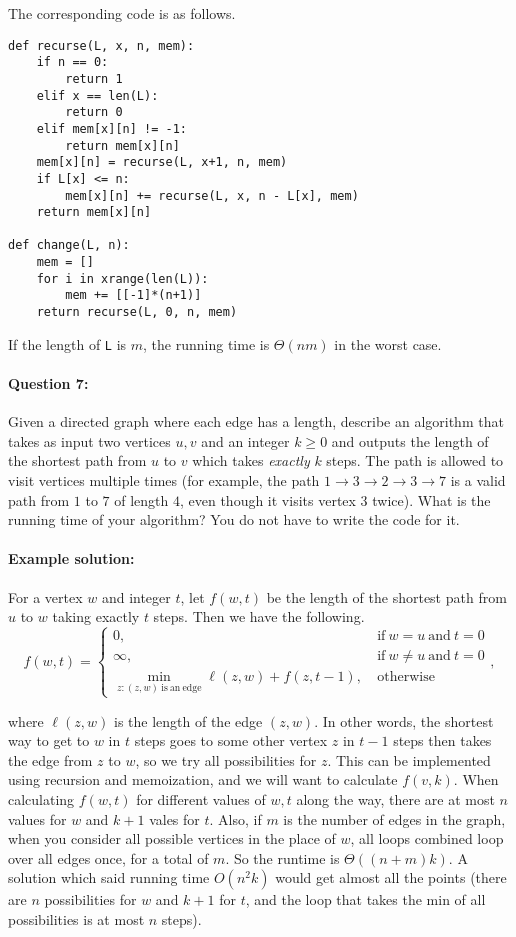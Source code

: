 \documentclass[11pt]{article}
\begin{document}
The corresponding code is as follows.

\begin{verbatim}
def recurse(L, x, n, mem):
    if n == 0:
        return 1
    elif x == len(L):
        return 0
    elif mem[x][n] != -1:
        return mem[x][n]
    mem[x][n] = recurse(L, x+1, n, mem)
    if L[x] <= n:
        mem[x][n] += recurse(L, x, n - L[x], mem)
    return mem[x][n]

def change(L, n):
    mem = []
    for i in xrange(len(L)):
        mem += [[-1]*(n+1)]
    return recurse(L, 0, n, mem)
\end{verbatim}

If the length of \texttt{L} is $m$, the running time is $\Theta(nm)$
in the worst case.

\paragraph{Question 7:}  Given a directed graph where each edge has a
length, describe an algorithm that takes as input two vertices $u,v$
and an integer $k\ge 0$ and outputs the length of the shortest path
from $u$ to $v$ which takes {\em exactly} $k$ steps.  The path is
allowed to visit vertices multiple times (for example, the path
$1\rightarrow 3\rightarrow 2\rightarrow 3\rightarrow 7$ is a valid
path from $1$ to $7$ of length $4$, even though it visits vertex $3$
twice).  What is the running time of your algorithm?  You do not have
to write the code for it.

\paragraph{Example solution:}
For a vertex $w$ and integer $t$, let $f(w,t)$ be the length of the
shortest path from $u$ to $w$ taking exactly $t$ steps. Then we have
the following.
$$
f(w, t) = \begin{cases} 0, \ &
  \mathrm{if}\ w=u\ \mathrm{and}\ t=0
\\ \infty, \ & \mathrm{if}\ w\neq u\ \mathrm{and}\ t=0
\\ \min_{z: (z,w)\ \mathrm{is\ an\ edge}} \ell(z,w) + f(z,t-1), \ &
\mathrm{otherwise}
\end{cases} ,
$$

where $\ell(z,w)$ is the length of the edge $(z,w)$.  In other words,
the shortest way to get to $w$ in $t$ steps goes to some other vertex
$z$ in $t-1$ steps then takes the edge from $z$ to $w$, so we try all
possibilities for $z$.  This can be implemented using recursion and
memoization, and we will want to calculate $f(v, k)$.  When
calculating $f(w,t)$ for different values of $w,t$ along the way,
there are at most $n$ values for $w$ and $k+1$ vales for $t$.  Also,
if $m$ is the number of edges in the graph, when you consider all
possible vertices in the place of $w$, all loops combined loop over
all edges once, for a total of $m$.  So the runtime is
$\Theta((n+m)k)$.  A solution which said running time $O(n^2k)$ would
get almost all the points (there are $n$ possibilities for $w$ and
$k+1$ for $t$, and the loop that takes the min of all possibilities is
at most $n$ steps).
\end{document}

